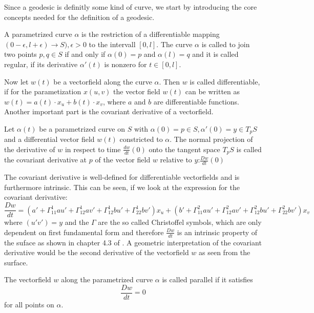 Since a geodesic is definitly some kind of curve, we start by introducing the core concepts needed for the definition of a geodesic.
\begin{mydef}
	A parametrized curve $\alpha$ is the restriction of a differentiable mapping $( 0-\epsilon, l+\epsilon) \rightarrow S), \epsilon > 0$ to the intervall $[0,l]$.
	The curve $\alpha$ is called to join two points $p,q \in S$ if and only if $\alpha(0) = p$ and $\alpha(l) = q$ and it is called regular, if its derivative $\alpha'(t)$ is nonzero for $t \in [0,l]$.
\end{mydef}
Now let $w(t)$ be a vectorfield along the curve $\alpha$.
Then $w$ is called differentiable, if for the parametization $x(u,v)$ the vector field $w(t)$ can be written as $w(t) = a(t) \cdot x_u + b(t) \cdot x_v$, where $a$ and $b$ are differentiable functions.
Another important part is the covariant derivative of a vectorfield.
\begin{mydef}
	Let $\alpha(t)$ be a parametrized curve on $S$ with $\alpha(0) = p \in S, \alpha'(0) = y \in T_pS$ and a differential vector field $w(t)$ constricted to $\alpha$.
	The normal projection of the derivative of $w$ in respect to time $\frac{dw}{dt}(0)$ onto the tangent space $T_pS$ is called the covariant derivative at $p$ of the vector field $w$ relative to $y$:$\frac{Dw}{dt}(0)$
\end{mydef}
The covariant derivative is well-defined for differentiable vectorfields and is furthermore intrinsic.
This can be seen, if we look at the expression for the covariant derivative:
$$\frac{Dw}{dt} = (a' + \Gamma^{1}_{1 1} a u' + \Gamma^{1}_{1 2} a v' + \Gamma^{1}_{1 2} b u' + \Gamma^{1}_{2 2} b v')x_u + (b' + \Gamma^{2}_{1 1} a u' + \Gamma^{2}_{1 2} a v' + \Gamma^{2}_{1 2} b u' + \Gamma^{2}_{2 2} b v')x_v$$
where $(u' v') = y$  and the $\Gamma$ are the so called Christoffel symbols, which are only dependent on first fundamental form and therefore $\frac{Dw}{dt}$ is an intrinsic property of the suface as shown in chapter 4.3 of \cite{do1976differential}.
A geometric interpretation of the covariant derivative would be the second derivative of the vectorfield $w$ as seen from the surface.
\begin{mydef}
	The vectorfield $w$ along the parametrized curve $\alpha$ is called parallel if it satisfies
	$$\frac{Dw}{dt} = 0 $$
	for all points on $\alpha$.
\end{mydef}

